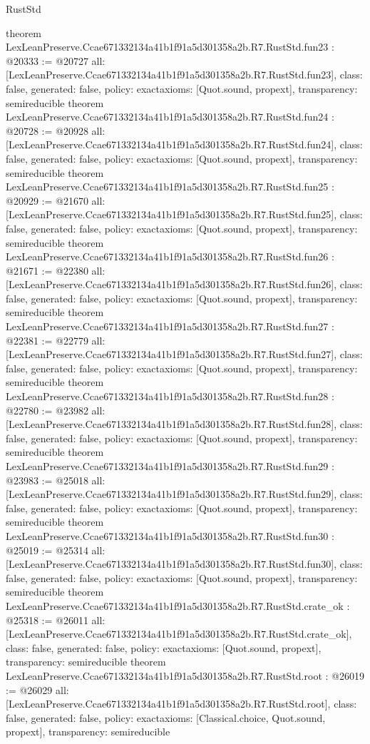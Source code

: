 \begin{lexlean}{RustStd}
\begin{coremodule}
{}
theorem LexLeanPreserve.Ccae671332134a41b1f91a5d301358a2b.R7.RustStd.fun23 : @20333 := @20727 {
  all: [LexLeanPreserve.Ccae671332134a41b1f91a5d301358a2b.R7.RustStd.fun23],
  class: false,
  generated: false,
  policy: exact{axioms: [Quot.sound, propext]},
  transparency: semireducible
}
theorem LexLeanPreserve.Ccae671332134a41b1f91a5d301358a2b.R7.RustStd.fun24 : @20728 := @20928 {
  all: [LexLeanPreserve.Ccae671332134a41b1f91a5d301358a2b.R7.RustStd.fun24],
  class: false,
  generated: false,
  policy: exact{axioms: [Quot.sound, propext]},
  transparency: semireducible
}
theorem LexLeanPreserve.Ccae671332134a41b1f91a5d301358a2b.R7.RustStd.fun25 : @20929 := @21670 {
  all: [LexLeanPreserve.Ccae671332134a41b1f91a5d301358a2b.R7.RustStd.fun25],
  class: false,
  generated: false,
  policy: exact{axioms: [Quot.sound, propext]},
  transparency: semireducible
}
theorem LexLeanPreserve.Ccae671332134a41b1f91a5d301358a2b.R7.RustStd.fun26 : @21671 := @22380 {
  all: [LexLeanPreserve.Ccae671332134a41b1f91a5d301358a2b.R7.RustStd.fun26],
  class: false,
  generated: false,
  policy: exact{axioms: [Quot.sound, propext]},
  transparency: semireducible
}
theorem LexLeanPreserve.Ccae671332134a41b1f91a5d301358a2b.R7.RustStd.fun27 : @22381 := @22779 {
  all: [LexLeanPreserve.Ccae671332134a41b1f91a5d301358a2b.R7.RustStd.fun27],
  class: false,
  generated: false,
  policy: exact{axioms: [Quot.sound, propext]},
  transparency: semireducible
}
theorem LexLeanPreserve.Ccae671332134a41b1f91a5d301358a2b.R7.RustStd.fun28 : @22780 := @23982 {
  all: [LexLeanPreserve.Ccae671332134a41b1f91a5d301358a2b.R7.RustStd.fun28],
  class: false,
  generated: false,
  policy: exact{axioms: [Quot.sound, propext]},
  transparency: semireducible
}
theorem LexLeanPreserve.Ccae671332134a41b1f91a5d301358a2b.R7.RustStd.fun29 : @23983 := @25018 {
  all: [LexLeanPreserve.Ccae671332134a41b1f91a5d301358a2b.R7.RustStd.fun29],
  class: false,
  generated: false,
  policy: exact{axioms: [Quot.sound, propext]},
  transparency: semireducible
}
theorem LexLeanPreserve.Ccae671332134a41b1f91a5d301358a2b.R7.RustStd.fun30 : @25019 := @25314 {
  all: [LexLeanPreserve.Ccae671332134a41b1f91a5d301358a2b.R7.RustStd.fun30],
  class: false,
  generated: false,
  policy: exact{axioms: [Quot.sound, propext]},
  transparency: semireducible
}
theorem LexLeanPreserve.Ccae671332134a41b1f91a5d301358a2b.R7.RustStd.crate_ok : @25318 := @26011 {
  all: [LexLeanPreserve.Ccae671332134a41b1f91a5d301358a2b.R7.RustStd.crate_ok],
  class: false,
  generated: false,
  policy: exact{axioms: [Quot.sound, propext]},
  transparency: semireducible
}
theorem LexLeanPreserve.Ccae671332134a41b1f91a5d301358a2b.R7.RustStd.root : @26019 := @26029 {
  all: [LexLeanPreserve.Ccae671332134a41b1f91a5d301358a2b.R7.RustStd.root],
  class: false,
  generated: false,
  policy: exact{axioms: [Classical.choice, Quot.sound, propext]},
  transparency: semireducible
}


\end{coremodule}
\end{lexlean}
